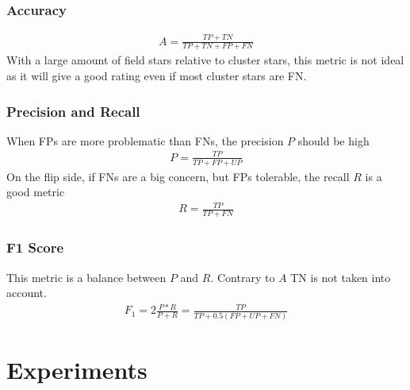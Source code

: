 \documentclass[letterpaper,10pt,english]{sphinxmanual}
\begin{document}
\subsection{Accuracy}
\label{\detokenize{NBodySimulation/Clustering:accuracy}}\begin{equation*}
\begin{split}A = \frac{TP+TN}{TP+TN+FP+FN}\end{split}
\end{equation*}
\sphinxAtStartPar
With a large amount of field stars relative to cluster stars, this metric is not ideal as it will give a good rating even if most cluster stars are FN.


\subsection{Precision and Recall}
\label{\detokenize{NBodySimulation/Clustering:precision-and-recall}}
\sphinxAtStartPar
When FPs are more problematic than FNs, the precision \(P\) should be high
\begin{equation*}
\begin{split}P = \frac{TP}{TP+FP+UP}\end{split}
\end{equation*}
\sphinxAtStartPar
On the flip side, if FNs are a big concern, but FPs tolerable, the recall \(R\) is a good metric
\begin{equation*}
\begin{split}R = \frac{TP}{TP+FN}\end{split}
\end{equation*}

\subsection{F1 Score}
\label{\detokenize{NBodySimulation/Clustering:f1-score}}
\sphinxAtStartPar
This metric is a balance between \(P\) and \(R\). Contrary to \(A\) TN is not taken into account.
\begin{equation*}
\begin{split}F_1 = 2 \frac{P*R}{P+R} = \frac{TP}{TP+0.5(FP+UP+FN)}\end{split}
\end{equation*}

\chapter{Experiments}
\label{\detokenize{NBodySimulation/Experiments:experiments}}\label{\detokenize{NBodySimulation/Experiments::doc}}
\end{document}
